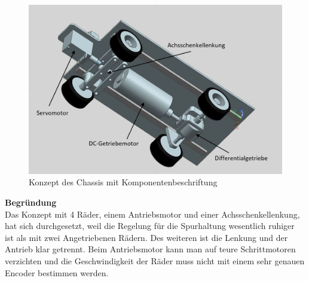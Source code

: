 \begin{figure}[H]%
\centering
\includegraphics[width=1\textwidth]{03_Loesungskonzept/pictures/Chassis_1.JPG}
\caption{Konzept des Chassis mit Komponentenbeschriftung}
\label{fig:activityRoute}
\end{figure}\flushleft
\textbf{Begründung}
\\[0.2cm]
Das Konzept mit 4 Räder, einem Antriebsmotor und einer Achsschenkellenkung, hat sich durchgesetzt, weil die Regelung für die Spurhaltung wesentlich ruhiger ist als mit zwei Angetriebenen Rädern. Des weiteren ist die Lenkung und der Antrieb klar getrennt. Beim Antriebsmotor kann man auf teure Schrittmotoren verzichten und die Geschwindigkeit der Räder muss nicht mit einem sehr genauen Encoder bestimmen werden.